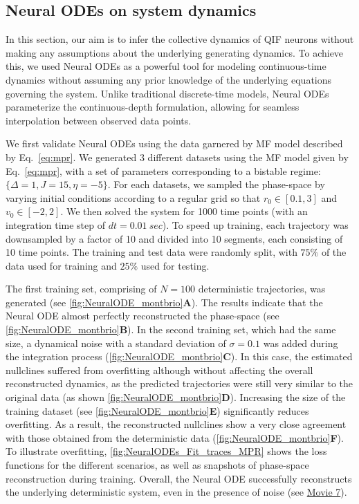 \documentclass[preprint,11pt,authoryear]{elsarticle}
\begin{document}
\subsection{Neural ODEs on system dynamics}

In this section, our aim is to infer the collective dynamics of QIF neurons without making any assumptions about the underlying generating dynamics. To achieve this, we used Neural ODEs as a powerful tool for modeling continuous-time dynamics without assuming any prior knowledge of the underlying equations governing the system. Unlike traditional discrete-time models, Neural ODEs parameterize the continuous-depth formulation, allowing for seamless interpolation between observed data points.


We first validate Neural ODEs using the data garnered by MF model described by Eq.~\eqref{eq:mpr}.  We generated 3 different datasets using the MF model given by Eq.~\eqref{eq:mpr}, with a set of parameters corresponding to a bistable regime: $\{\Delta=1,J=15,\eta=-5\}$. For each datasets, we sampled the phase-space by varying initial conditions according to a regular grid so that $r_0\in[0.1, 3]$ and $v_0\in[-2,2]$. We then solved the system for 1000 time points (with an integration time step of $dt=0.01~sec$). To speed up training, each trajectory was downsampled by a factor of 10 and divided into 10 segments, each consisting of 10 time points. The training and test data were randomly split, with $75\%$ of the data used for training and $25\%$ used for testing. 


The first training set, comprising of $N=100$ deterministic trajectories, was generated (see \autoref{fig:NeuralODE_montbrio}\textbf{A}). The results indicate that the Neural ODE almost perfectly reconstructed the phase-space (see \autoref{fig:NeuralODE_montbrio}\textbf{B}). In the second training set, which had the same size, a dynamical noise with a standard deviation of $\sigma=0.1$ was added during the integration process (\autoref{fig:NeuralODE_montbrio}\textbf{C}). In this case, the estimated nullclines suffered from overfitting although without affecting the overall reconstructed dynamics, as the predicted trajectories were still very similar to the original data  (as shown \autoref{fig:NeuralODE_montbrio}\textbf{D}). Increasing the size of the training dataset (see \autoref{fig:NeuralODE_montbrio}\textbf{E}) significantly reduces overfitting.  As a result, the reconstructed nullclines show a very close agreement with those obtained from the deterministic data (\autoref{fig:NeuralODE_montbrio}\textbf{F}).
To illustrate overfitting, \autoref{fig:NeuralODEs_Fit_traces_MPR} shows the loss functions for the different scenarios, as well as snapshots of phase-space reconstruction during training. Overall, the Neural ODE successfully reconstructs the underlying deterministic system, even in the presence of noise (see \href{run:https://github.com/ins-amu/Inference_MFM/blob/main/Videos/Movie7_MPR_PhasePlane_NeuralODEs.mp4}{Movie 7}).
\end{document}
